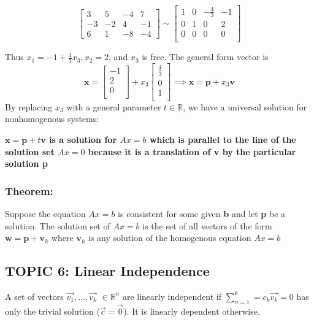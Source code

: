 \documentclass[12pt]{article} %
\newcommand{\R}{\mathbb{R}}
\begin{document}
$$\begin{bmatrix}
	3 & 5 & -4 & 7\\
	-3 & -2 & 4 & -1\\
	6 & 1 & -8 & -4
\end{bmatrix} \sim
\begin{bmatrix}
	1 & 0 & -\frac{4}{3} & -1\\
	0 & 1 & 0 & 2\\
	0 & 0 & 0 & 0\\
\end{bmatrix}$$

Thus $x_1 = -1 +\frac{4}{3}x_3,  x_2=2$, and $x_3$ is free. The general form vector is 
$$\mathbf{x} = \begin{bmatrix}
	-1\\
	2\\
	0\\
\end{bmatrix} + x_3\begin{bmatrix}
	\frac{4}{3}\\
	0\\
	1\\
\end{bmatrix} \implies \mathbf{x} = \mathbf{p} + x_3 \mathbf{v}$$
By replacing $x_3$ with a general parameter $t \in \R$, we have a universal solution for nonhomogenous systems:

\textbf{$\mathbf{x} = \mathbf{p} + t \mathbf{v}$ is a solution for $Ax = b$ which is parallel to the line of the solution set $Ax = 0$ because it is a translation of v by the particular solution p} 

\subsubsection{Theorem:}
Suppose the equation $Ax=b$ is consistent for some given \textbf{b} and let \textbf{p} be a solution. The solution set of $Ax =b$ is the set of all vectors of the form $\mathbf{w} = \mathbf{p} + \mathbf{v}_h$ where $\mathbf{v}_h$ is any solution of the homogenous equation $Ax=b$

\subsection{TOPIC 6: Linear Independence}
A set of vectors {$\vec{v_1}, ..., \vec{v_k}$} $\in \R^n$ are linearly independent if $\sum_{n=1}^k = c_k \vec{v_k} = 0$ has only the trivial solution ($\vec{c} = \vec{0}$). It is linearly dependent otherwise. 
\end{document}
